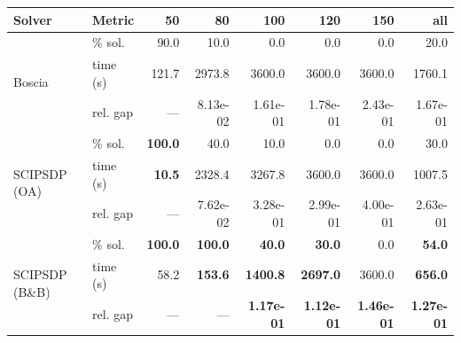 \begin{tabular}{llrrrrrr}
\toprule
 Solver & Metric & 50 & 80 & 100 & 120 & 150 & all \\
\midrule
\multirow{3}{*}{Boscia} & \% sol. & 90.0 & 10.0 & 0.0 & 0.0 & 0.0 & 20.0 \\
  & time (s) & 121.7 & 2973.8 & 3600.0 & 3600.0 & 3600.0 & 1760.1 \\
  & rel. gap & --- & 8.13e-02 & 1.61e-01 & 1.78e-01 & 2.43e-01 & 1.67e-01 \\
\midrule
\multirow{3}{*}{SCIPSDP (OA)} & \% sol. & \textbf{100.0} & 40.0 & 10.0 & 0.0 & 0.0 & 30.0 \\
  & time (s) & \textbf{10.5} & 2328.4 & 3267.8 & 3600.0 & 3600.0 & 1007.5 \\
  & rel. gap & --- & 7.62e-02 & 3.28e-01 & 2.99e-01 & 4.00e-01 & 2.63e-01 \\
\midrule
\multirow{3}{*}{SCIPSDP (B\&B)} & \% sol. & \textbf{100.0} & \textbf{100.0} & \textbf{40.0} & \textbf{30.0} & 0.0 & \textbf{54.0} \\
  & time (s) & 58.2 & \textbf{153.6} & \textbf{1400.8} & \textbf{2697.0} & 3600.0 & \textbf{656.0} \\
  & rel. gap & --- & --- & \textbf{1.17e-01} & \textbf{1.12e-01} & \textbf{1.46e-01} & \textbf{1.27e-01} \\
\bottomrule
\end{tabular}
